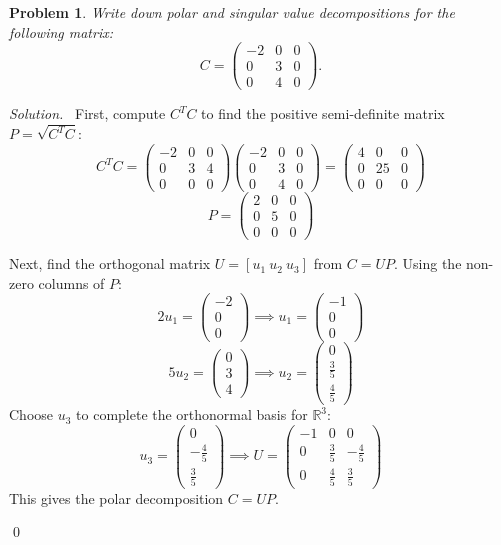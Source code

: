\documentclass[12pt,a4paper]{article}
\newenvironment{solution}{%
  \par\noindent\textit{Solution.}\ }{\qed}
\theoremstyle{problemstyle}
\newtheorem{problem}{Problem}[section]
\begin{document}
\begin{problem}\label{prob:5-8}
Write down polar and singular value decompositions for the following matrix:
\[
  C = \begin{pmatrix} -2 & 0 & 0 \\ 0 & 3 & 0 \\ 0 & 4 & 0 \end{pmatrix}.
\]
\end{problem}
\begin{solution}
First, compute \( C^T C \) to find the positive semi-definite matrix \( P = \sqrt{C^T C} \):
\[ C^T C = \begin{pmatrix} -2 & 0 & 0 \\ 0 & 3 & 4 \\ 0 & 0 & 0 \end{pmatrix} \begin{pmatrix} -2 & 0 & 0 \\ 0 & 3 & 0 \\ 0 & 4 & 0 \end{pmatrix} = \begin{pmatrix} 4 & 0 & 0 \\ 0 & 25 & 0 \\ 0 & 0 & 0 \end{pmatrix} \]
\[ P = \begin{pmatrix} 2 & 0 & 0 \\ 0 & 5 & 0 \\ 0 & 0 & 0 \end{pmatrix} \]

Next, find the orthogonal matrix \( U = [u_1 \ u_2 \ u_3] \) from \( C = UP \). Using the non-zero columns of \( P \):
\[ 2u_1 = \begin{pmatrix} -2 \\ 0 \\ 0 \end{pmatrix} \implies u_1 = \begin{pmatrix} -1 \\ 0 \\ 0 \end{pmatrix} \]
\[ 5u_2 = \begin{pmatrix} 0 \\ 3 \\ 4 \end{pmatrix} \implies u_2 = \begin{pmatrix} 0 \\ \frac{3}{5} \\ \frac{4}{5} \end{pmatrix} \]
Choose \( u_3 \) to complete the orthonormal basis for \( \mathbb{R}^3 \):
\[ u_3 = \begin{pmatrix} 0 \\ -\frac{4}{5} \\ \frac{3}{5} \end{pmatrix} \implies U = \begin{pmatrix} -1 & 0 & 0 \\ 0 & \frac{3}{5} & -\frac{4}{5} \\ 0 & \frac{4}{5} & \frac{3}{5} \end{pmatrix} \]
This gives the polar decomposition \( C = UP \).


\end{solution}
\end{document}
